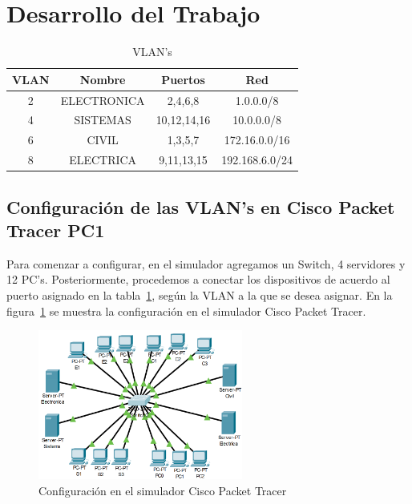 \section{Desarrollo del Trabajo}

    \begin{table}[H]
        \begin{center}
            \begin{tabular}{ c | c | c | c }
                \textbf{VLAN} & \textbf{Nombre} & \textbf{Puertos} & \textbf{Red}\\ \hline
                2 & ELECTRONICA & 2,4,6,8 & 1.0.0.0/8\\
                4 & SISTEMAS & 10,12,14,16 & 10.0.0.0/8\\
                6 & CIVIL & 1,3,5,7 & 172.16.0.0/16\\
                8 & ELECTRICA & 9,11,13,15 & 192.168.6.0/24\\
            \end{tabular}
            \caption{VLAN's}
            \label{tab:VLANs}
            \end{center}
    \end{table}

    \subsection{Configuración de las VLAN's en Cisco Packet Tracer PC1}
        Para comenzar a configurar, en el simulador agregamos un Switch, 4 servidores y 12 PC's. Posteriormente, procedemos a conectar los dispositivos de acuerdo al puerto asignado en la tabla~\ref{tab:VLANs}, según la VLAN a la que se desea asignar. En la figura~\ref{fig:cisco} se muestra la configuración en el simulador Cisco Packet Tracer.

        \begin{figure}[H]
            \centering
            \includegraphics[width=0.6\textwidth]{img/cisco.png}
            \caption{Configuración en el simulador Cisco Packet Tracer}
            \label{fig:cisco}
        \end{figure}


